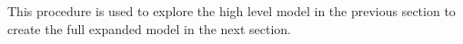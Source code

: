 
This procedure is used to explore the high level model in the previous section to create the full expanded model in the next section.
